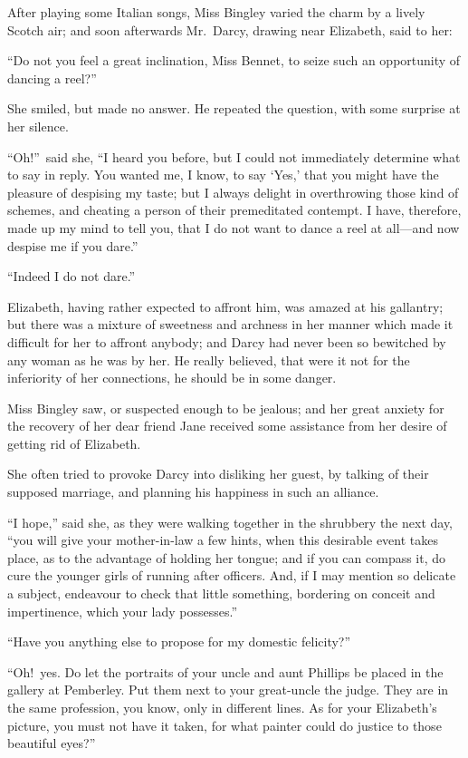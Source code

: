 \documentclass[12pt,english,oneside]{book}
\begin{document}
After playing some Italian songs, Miss Bingley varied the charm by
a lively Scotch air; and soon afterwards Mr.\ Darcy, drawing near
Elizabeth, said to her:

{}``Do not you feel a great inclination, Miss Bennet, to seize such
an opportunity of dancing a reel?''\ 

She smiled, but made no answer. He repeated the question, with some
surprise at her silence.

{}``Oh!''\ said she, {}``I heard you before, but I could not immediately
determine what to say in reply. You wanted me, I know, to say `Yes,'
that you might have the pleasure of despising my taste; but I always
delight in overthrowing those kind of schemes, and cheating a person
of their premeditated contempt. I have, therefore, made up my mind
to tell you, that I do not want to dance a reel at all\mbox{---}and
now despise me if you dare.''

{}``Indeed I do not dare.''

Elizabeth, having rather expected to affront him, was amazed at his
gallantry; but there was a mixture of sweetness and archness in her
manner which made it difficult for her to affront anybody; and Darcy
had never been so bewitched by any woman as he was by her. He really
believed, that were it not for the inferiority of her connections,
he should be in some danger.

Miss Bingley saw, or suspected enough to be jealous; and her great
anxiety for the recovery of her dear friend Jane received some assistance
from her desire of getting rid of Elizabeth.

She often tried to provoke Darcy into disliking her guest, by talking
of their supposed marriage, and planning his happiness in such an
alliance.

{}``I hope,'' said she, as they were walking together in the shrubbery
the next day, {}``you will give your mother-in-law a few hints, when
this desirable event takes place, as to the advantage of holding her
tongue; and if you can compass it, do cure the younger girls of running
after officers. And, if I may mention so delicate a subject, endeavour
to check that little something, bordering on conceit and impertinence,
which your lady possesses.''

{}``Have you anything else to propose for my domestic felicity?''\ 

{}``Oh!\ yes. Do let the portraits of your uncle and aunt Phillips
be placed in the gallery at Pemberley. Put them next to your great-uncle
the judge. They are in the same profession, you know, only in different
lines. As for your Elizabeth's picture, you must not have it taken,
for what painter could do justice to those beautiful eyes?''\ 
\end{document}
